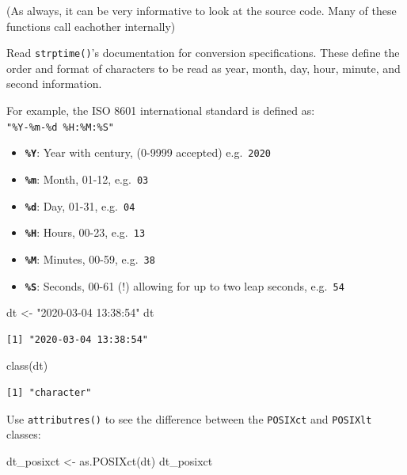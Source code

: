 \documentclass[
]{book}
\newenvironment{Shaded}{\begin{snugshade}}{\end{snugshade}}
\newcommand{\FunctionTok}[1]{\textcolor[rgb]{0.00,0.00,0.00}{#1}}
\newcommand{\NormalTok}[1]{#1}
\newcommand{\OtherTok}[1]{\textcolor[rgb]{0.56,0.35,0.01}{#1}}
\newcommand{\StringTok}[1]{\textcolor[rgb]{0.31,0.60,0.02}{#1}}
\providecommand{\tightlist}{%
  \setlength{\itemsep}{0pt}\setlength{\parskip}{0pt}}
\begin{document}
(As always, it can be very informative to look at the source code. Many of these functions call eachother internally)

Read \texttt{strptime()}'s documentation for conversion specifications. These define the order and format of characters to be read as year, month, day, hour, minute, and second information.

For example, the ISO 8601 international standard is defined as:\\
\texttt{"\%Y-\%m-\%d\ \%H:\%M:\%S"}

\begin{itemize}
\tightlist
\item
  \textbf{\texttt{\%Y}}: Year with century, (0-9999 accepted) e.g.~\texttt{2020}
\item
  \textbf{\texttt{\%m}}: Month, 01-12, e.g.~\texttt{03}
\item
  \textbf{\texttt{\%d}}: Day, 01-31, e.g.~\texttt{04}
\item
  \textbf{\texttt{\%H}}: Hours, 00-23, e.g.~\texttt{13}
\item
  \textbf{\texttt{\%M}}: Minutes, 00-59, e.g.~\texttt{38}
\item
  \textbf{\texttt{\%S}}: Seconds, 00-61 (!) allowing for up to two leap seconds, e.g.~\texttt{54}
\end{itemize}

\begin{Shaded}
\begin{Highlighting}[]
\NormalTok{dt }\OtherTok{\textless{}{-}} \StringTok{"2020{-}03{-}04 13:38:54"}
\NormalTok{dt}
\end{Highlighting}
\end{Shaded}

\begin{verbatim}
[1] "2020-03-04 13:38:54"
\end{verbatim}

\begin{Shaded}
\begin{Highlighting}[]
\FunctionTok{class}\NormalTok{(dt)}
\end{Highlighting}
\end{Shaded}

\begin{verbatim}
[1] "character"
\end{verbatim}

Use \texttt{attributres()} to see the difference between the \texttt{POSIXct} and \texttt{POSIXlt} classes:

\begin{Shaded}
\begin{Highlighting}[]
\NormalTok{dt\_posixct }\OtherTok{\textless{}{-}} \FunctionTok{as.POSIXct}\NormalTok{(dt)}
\NormalTok{dt\_posixct}
\end{Highlighting}
\end{Shaded}
\end{document}
